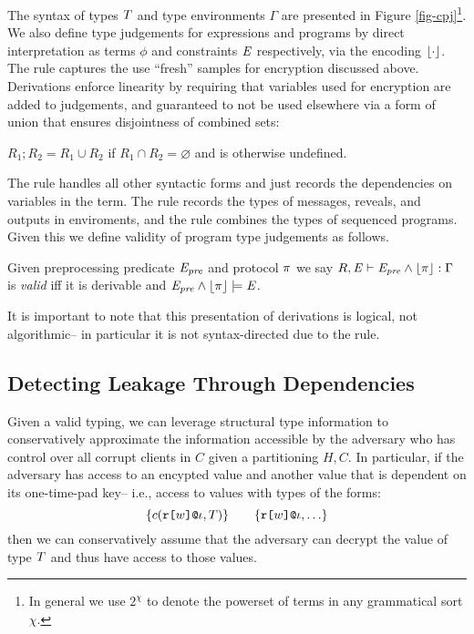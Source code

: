 \cpjfig

The syntax of types $T$ and type environments $\Gamma$ are presented
in Figure \ref{fig-cpj}\footnote{In general we use $2^{\chi}$ to denote
the powerset of terms in any grammatical sort $\chi$.}. We also
define type judgements for expressions and programs by direct
interpretation as terms $\phi$ and constraints $\mathit{E}$ respectively,
via the encoding $\lfloor \cdot \rfloor$. The  rule captures
the use ``fresh'' samples for encryption discussed above. Derivations
enforce linearity by requiring that variables used for encryption
are added to judgements, and guaranteed to not be used elsewhere
via a form of union that ensures disjointness of combined sets:
\begin{definition}
  $R_1;R_2 = R_1 \cup R_2$ if $R_1 \cap R_2 = \varnothing$ and is otherwise
  undefined.
\end{definition}
The  rule handles all other syntactic forms and just
records the dependencies on variables in the term.  The 
rule records the types of messages, reveals, and outputs in
enviroments, and the  rule combines the types of
sequenced programs.  Given this we define validity of program type
judgements as follows. 
\begin{definition}
  Given preprocessing predicate $\mathit{E}_{\mathit{pre}}$ and protocol $\pi$ we say
  $R,\mathit{E} \vdash \mathit{E}_{\mathit{pre}} \wedge \lfloor \pi \rfloor : \Gamma$ is \emph{valid} iff it is derivable and
  $\mathit{E}_{\mathit{pre}} \wedge \lfloor \pi \rfloor \models \mathit{E}$.
\end{definition}
It is important to note that this presentation of derivations is
logical, not algorithmic-- in particular it is not syntax-directed
due to the  rule.

\subsection{Detecting Leakage Through Dependencies}

Given a valid typing, we can leverage structural type information to
conservatively approximate the information accessible by the
adversary who has control over all corrupt clients in $C$ given
a partitioning $H,C$. In particular, if the adversary has access to an
encypted value and another value that is dependent on its one-time-pad
key-- i.e., access to values with types of the forms:
$$
\{ c(\texttt{r[}w\texttt{]}\texttt{@}\iota,T) \} \qquad \{ \texttt{r[}w\texttt{]}\texttt{@}\iota, \ldots \} 
$$
then we can conservatively assume that the adversary can decrypt the
value of type $T$ and thus have access to those values.

